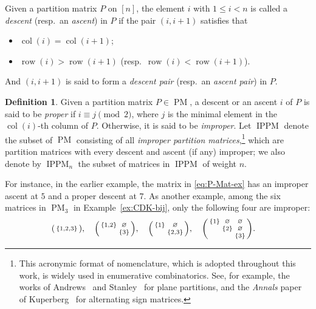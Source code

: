 \documentclass[12pt,reqno]{amsart}
\numberwithin{equation}{section}
\theoremstyle{theorem}
\theoremstyle{definition}
\newtheorem{definition}[theorem]{Definition}
\theoremstyle{named}
\newcommand{\MatP}{\operatorname{PM}}
\newcommand{\col}{\operatorname{col}}
\newcommand{\row}{\operatorname{row}}
\newcommand{\IPPM}{\operatorname{IPPM}}
\begin{document}
Given a partition matrix $P$ on $[n]$, the element $i$ with $1\le i<n$ is called a \emph{descent} (resp.~an \emph{ascent}) in $P$ if the pair $(i,i+1)$ satisfies that
\begin{itemize}[itemindent=*, leftmargin=*, itemsep=2pt, topsep=2pt, parsep=2pt]
	\item $\col(i)=\col(i+1)$;
	
	\item $\row(i)>\row(i+1)$ (resp.~$\row(i)<\row(i+1)$).
\end{itemize}
And $(i,i+1)$ is said to form a \emph{descent pair} (resp.~an \emph{ascent pair}) in $P$.

\begin{definition}\label{def:MIP}
	Given a partition matrix $P\in \MatP$, a descent or an ascent $i$ of $P$ is said to be \emph{proper} if $i\equiv j\pmod 2$, where $j$ is the minimal element in the $\col(i)$-th column of $P$. Otherwise, it is said to be \emph{improper}. Let $\IPPM$ denote the subset of $\MatP$ consisting of all \emph{improper partition matrices},\footnote{This acronymic format of nomenclature, which is adopted throughout this work, is widely used in enumerative combinatorics. See, for example, the works of Andrews~\cite{And1994} and Stanley~\cite{Sta1986} for plane partitions, and the \textit{Annals} paper of Kuperberg~\cite{Kup2002} for alternating sign matrices.} which are partition matrices with every descent and ascent (if any) improper; we also denote by $\IPPM_{n}$ the subset of matrices in $\IPPM$ of weight $n$.
\end{definition}

For instance, in the earlier example, the matrix in \eqref{eq:P-Mat-ex} has an improper ascent at $5$ and a proper descent at $7$. As another example, among the six matrices in $\MatP_3$ in Example~\ref{ex:CDK-bij}, only the following four are improper:
\begin{align*}
	&\begin{psmallmatrix}
		\{1,2,3\}
	\end{psmallmatrix},\quad
	\begin{psmallmatrix}
		\{1,2\} & \varnothing \\
		& \{3\}
	\end{psmallmatrix},\quad
	\begin{psmallmatrix}
		\{1\} & \varnothing \\
		& \{2,3\}
	\end{psmallmatrix},\quad
	\begin{psmallmatrix}
		\{1\} & \varnothing & \varnothing \\
		& \{2\} & \varnothing \\
		& & \{3\}
	\end{psmallmatrix}.
\end{align*}
\end{document}
